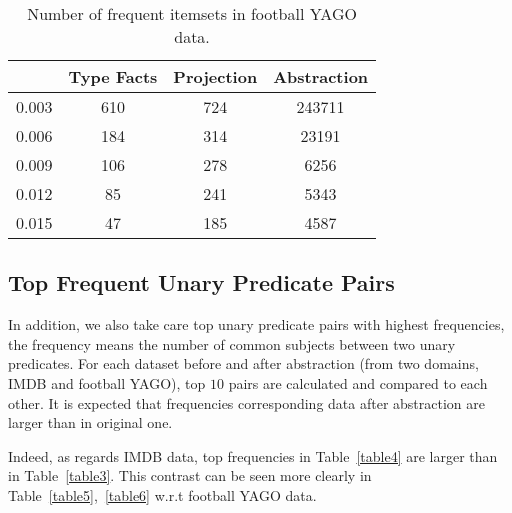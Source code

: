 \documentclass{acm_proc_article-sp}
\begin{document}
\begin{table}[ht]
\caption{Number of frequent itemsets in football YAGO data.}
\label{table2}
\begin{center}
\begin{tabular}{ |c|c|c|c| } 
\hline
 & Type Facts & Projection & Abstraction\\
\hline
0.003 & 610 & 724 & 243711 \\
0.006 & 184 & 314 & 23191 \\
0.009 & 106 & 278 & 6256 \\
0.012 & 85 & 241 & 5343 \\
0.015 & 47 & 185 & 4587 \\
\hline
\end{tabular}
\end{center}
\end{table}

\subsection{Top Frequent Unary Predicate Pairs}

In addition, we also take care top unary predicate pairs with highest frequencies, the frequency means the number of common subjects between two unary predicates. For each dataset before and after abstraction (from two domains, IMDB and football YAGO), top $10$ pairs are calculated and compared to each other. It is expected that frequencies corresponding data after abstraction are larger than in original one.

Indeed, as regards IMDB data, top frequencies in Table~\ref{table4} are larger than in Table~\ref{table3}. This contrast can be seen more clearly in Table~\ref{table5},~\ref{table6} w.r.t football YAGO data.
\end{document}
